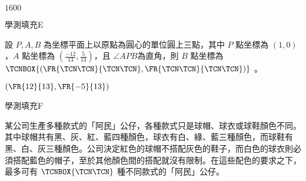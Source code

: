 \begin{QUESTIONS}
\begin{QUESTION}
        \begin{QTAGS}\end{QTAGS}
        \begin{QANS}
            $1600$
        \end{QANS}
        \begin{QSOLLIST}
        \end{QSOLLIST}
        \begin{QEMPTYSPACE}
        \end{QEMPTYSPACE}
    \end{QUESTION}
    \begin{QUESTION}
        \begin{ExamInfo}{96}{學測}{填充}{E}
        \end{ExamInfo}
        \begin{ExamAnsRateInfo}{29}{66}{18}{3}
        \end{ExamAnsRateInfo}
        \begin{QBODY}
            設 $P, A, B$ 為坐標平面上以原點為圓心的單位圓上三點，其中 $P$ 點坐標為 $(1, 0)$，$A$ 點坐標為 $(\frac{-12}{13},\frac{5}{13})$，且 $\angle APB$為直角，則 $B$ 點坐標為 $\TCNBOX{(\FR{\TCN\TCN}{\TCN\TCN},\FR{\TCN\TCN}{\TCN\TCN})}$ 。
        \end{QBODY}
        \begin{QFROMS}
        \end{QFROMS}
        \begin{QTAGS}\end{QTAGS}
        \begin{QANS}
            $(\FR{12}{13},\FR{-5}{13})$
        \end{QANS}
        \begin{QSOLLIST}
        \end{QSOLLIST}
        \begin{QEMPTYSPACE}
        \end{QEMPTYSPACE}
    \end{QUESTION}
    \begin{QUESTION}
        \begin{ExamInfo}{96}{學測}{填充}{F}
        \end{ExamInfo}
        \begin{ExamAnsRateInfo}{26}{38}{28}{12}
        \end{ExamAnsRateInfo}
        \begin{QBODY}
            某公司生產多種款式的「阿民」公仔，各種款式只是球帽、球衣或球鞋顏色不同。其中球帽共有黑、灰、紅、藍四種顏色，球衣有白、綠、藍三種顏色，而球鞋有黑、白、灰三種顏色。公司決定紅色的球帽不搭配灰色的鞋子，而白色的球衣則必須搭配藍色的帽子，至於其他顏色間的搭配就沒有限制。在這些配色的要求之下，最多可有 $\TCNBOX{\TCN\TCN}$ 種不同款式的「阿民」公仔。

\end{QBODY}
\end{QUESTION}
\end{QUESTIONS}
